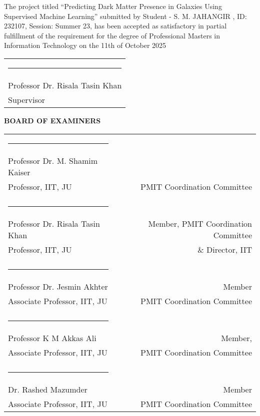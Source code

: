 The project titled “Predicting Dark Matter Presence in Galaxies Using Supervised Machine Learning” submitted by Student - S. M. JAHANGIR , ID: 232107, Session: Summer 23, has been accepted as satisfactory in partial fulfillment of the requirement for the degree of Professional Masters in Information Technology on the 11th of October 2025 


\bigskip
\bigskip


\noindent \begin{tabular}{l}

  \rule{4cm}{1pt} \\
  Professor Dr. Risala Tasin Khan \\ %
  Supervisor\\

\end{tabular}




\begin{center}
   \textbf{BOARD OF EXAMINERS}
\end{center}
\noindent \begin{tabular}{lp{1cm}r}
\centering
  \rule{4cm}{1pt}&\\
     Professor  Dr. M. Shamim Kaiser  \\
     Professor, IIT, JU  & & PMIT Coordination Committee  \\
     & &  \\
     \rule{4cm}{1pt}&\\
    Professor Dr. Risala Tasin Khan   & &Member, PMIT Coordination Committee   \\
     Professor, IIT, JU  & &\& Director, IIT\\
    & &  \\
     \rule{4cm}{1pt}&\\
    
 Professor Dr. Jesmin Akhter & &Member  \\
      Associate Professor, IIT, JU  & &PMIT Coordination Committee  \\
     &  \\
     \rule{4cm}{1pt}&\\
       Professor K M Akkas Ali  & &Member,
     \\
      Associate Professor, IIT, JU  & &PMIT Coordination Committee  \\
      &  \\
     \rule{4cm}{1pt}&\\
     Dr. Rashed Mazumder
  & &Member  \\
      Associate Professor, IIT, JU  & &PMIT Coordination Committee  \\
     
   

\end{tabular}


